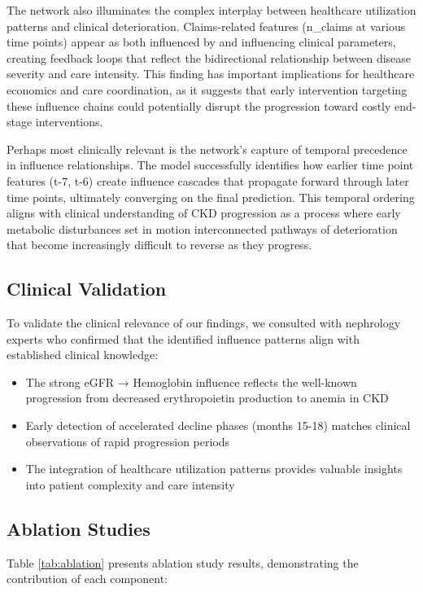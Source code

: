 \documentclass[letterpaper]{article}
\begin{document}
\begin{enumerate}
The network also illuminates the complex interplay between healthcare utilization patterns and clinical deterioration. Claims-related features (n\_claims at various time points) appear as both influenced by and influencing clinical parameters, creating feedback loops that reflect the bidirectional relationship between disease severity and care intensity. This finding has important implications for healthcare economics and care coordination, as it suggests that early intervention targeting these influence chains could potentially disrupt the progression toward costly end-stage interventions.

Perhaps most clinically relevant is the network's capture of temporal precedence in influence relationships. The model successfully identifies how earlier time point features (t-7, t-6) create influence cascades that propagate forward through later time points, ultimately converging on the final prediction. This temporal ordering aligns with clinical understanding of CKD progression as a process where early metabolic disturbances set in motion interconnected pathways of deterioration that become increasingly difficult to reverse as they progress.

\subsection{Clinical Validation}

To validate the clinical relevance of our findings, we consulted with nephrology experts who confirmed that the identified influence patterns align with established clinical knowledge:

\begin{itemize}
    \item The strong eGFR → Hemoglobin influence reflects the well-known progression from decreased erythropoietin production to anemia in CKD
    \item Early detection of accelerated decline phases (months 15-18) matches clinical observations of rapid progression periods
    \item The integration of healthcare utilization patterns provides valuable insights into patient complexity and care intensity
\end{itemize}

\subsection{Ablation Studies}

Table \ref{tab:ablation} presents ablation study results, demonstrating the contribution of each component:


\end{enumerate}
\end{document}
